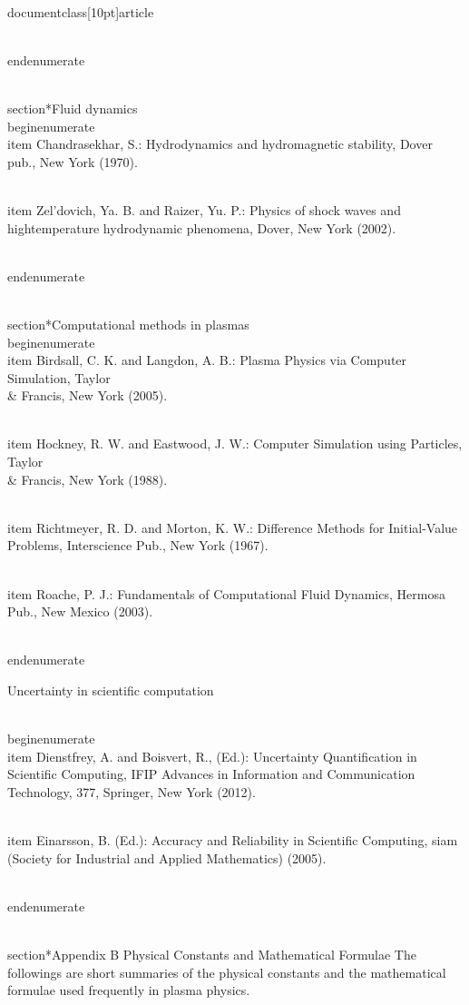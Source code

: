 \\documentclass[10pt]{article}
\begin{document}
{{{{{{\\end{enumerate}

\\section*{Fluid dynamics}
\\begin{enumerate}
  \\item Chandrasekhar, S.: Hydrodynamics and hydromagnetic stability, Dover pub., New York (1970).

  \\item Zel'dovich, Ya. B. and Raizer, Yu. P.: Physics of shock waves and hightemperature hydrodynamic phenomena, Dover, New York (2002).

\\end{enumerate}

\\section*{Computational methods in plasmas}
\\begin{enumerate}
  \\item Birdsall, C. K. and Langdon, A. B.: Plasma Physics via Computer Simulation, Taylor \\& Francis, New York (2005).

  \\item Hockney, R. W. and Eastwood, J. W.: Computer Simulation using Particles, Taylor \\& Francis, New York (1988).

  \\item Richtmeyer, R. D. and Morton, K. W.: Difference Methods for Initial-Value Problems, Interscience Pub., New York (1967).

  \\item Roache, P. J.: Fundamentals of Computational Fluid Dynamics, Hermosa Pub., New Mexico (2003).

\\end{enumerate}

Uncertainty in scientific computation

\\begin{enumerate}
  \\item Dienstfrey, A. and Boisvert, R., (Ed.): Uncertainty Quantification in Scientific Computing, IFIP Advances in Information and Communication Technology, 377, Springer, New York (2012).

  \\item Einarsson, B. (Ed.): Accuracy and Reliability in Scientific Computing, siam (Society for Industrial and Applied Mathematics) (2005).

\\end{enumerate}

\\section*{Appendix B 
 Physical Constants and Mathematical Formulae}
The followings are short summaries of the physical constants and the mathematical formulae used frequently in plasma physics.

}}}}}}
\end{document}
